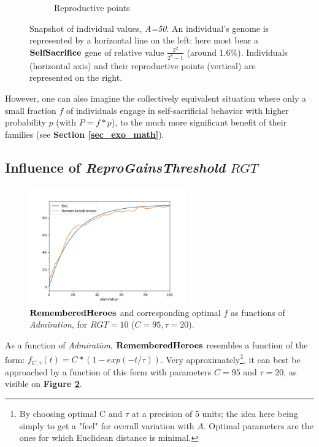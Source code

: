 \documentclass[a4paper,12pt]{report}
\begin{document}
\begin{figure}[h]
\begin{subfigure}[b]{0.3\linewidth}
        \caption{Reproductive points}
    \end{subfigure}
    \caption{Snapshot of individual values, \emph{A=50}. An individual's genome is represented by a horizontal line on the left: here most bear a $\bf{SelfSacrifice}$ gene
    of relative value $\frac{2^2}{2^8-1}$ (around $1.6\%$). Individuals (horizontal axis) and their reproductive points (vertical) are represented on the right.}
    \label{fig:Snap}
    \end{figure}


 However, one can also imagine the collectively equivalent situation where only a small fraction $f$ of individuals
 engage in self-sacrificial behavior with higher probability $p$ (with $P = f*p$), to the much more
 significant benefit of their families (see \textbf{Section \ref{sec_exo_math}}).

\subsection{Influence of \emph{ReproGainsThreshold} $RGT$}

\begin{figure}[h]
    \centering
    \includegraphics[width=0.6\textwidth]{f_rgt10}
    \caption{$\bf{RememberedHeroes}$ and corresponding optimal $f$ as functions of 
    \emph{Admiration}, for $RGT=10$ ($C=95, \tau = 20$).}
    \label{fig:f_10}
    \end{figure}

As a function of \emph{Admiration}, $\bf{RememberedHeroes}$ resembles a function of the form:
$f_{C,\tau}(t) = C*(1-exp(-t/\tau))$.
Very approximately\footnote{By choosing optimal C and $\tau$ at a precision of 5 units;
the idea here being simply to get a "feel" for overall variation with $A$. Optimal parameters are the
ones for which Euclidean distance is minimal.},
it can best be approached by a function of this form with parameters $C=95$ and $\tau = 20$, as visible
on \textbf{Figure \ref{fig:f_10}}.
\end{document}
